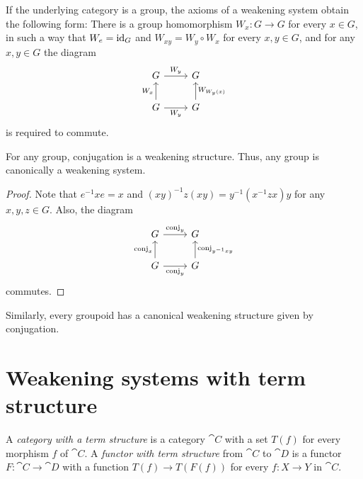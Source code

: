 \begin{rmk}
If the underlying category is a group, the axioms of a weakening system
obtain the following form: There is a group homomorphism $W_x:G\to G$ for
every $x\in G$, in such a way that $W_e={\mathrm{id}_{G}}$ and $W_{xy}=W_y\circ W_x$
for every $x,y\in G$, and for any $x,y\in G$ the diagram
\begin{equation*}
\begin{tikzcd}
G \arrow[r,"W_y"]
  &
G 
  \\
G \arrow[u,"W_x"]
  \arrow[r,swap,"W_y"]
  &
G \arrow[u,swap,"W_{W_y(x)}"]
\end{tikzcd}
\end{equation*}
is required to commute.
\end{rmk}

\begin{lem}
For any group, conjugation is a weakening structure. Thus, any group is
canonically a weakening system.
\end{lem}

\begin{proof}
Note that $e^{-1}xe=x$ and $(xy)^{-1}z(xy)=y^{-1}(x^{-1}zx)y$ for any $x,y,z\in G$.
Also, the diagram
\begin{equation*}
\begin{tikzcd}
G \arrow[r,"\mathrm{conj}_y"]
  &
G 
  \\
G \arrow[u,"\mathrm{conj}_x"]
  \arrow[r,swap,"\mathrm{conj}_y"]
  &
G \arrow[u,swap,"\mathrm{conj}_{y^{-1}xy}"]
\end{tikzcd}
\end{equation*}
commutes.
\end{proof}

\begin{rmk}
Similarly, every groupoid has a canonical weakening structure given by
conjugation.
\end{rmk}

\section{Weakening systems with term structure}
\begin{defn}
A \emph{category with a term structure} is a category $\cat{C}$ with a set $T(f)$ for every
morphism $f$ of $\cat{C}$. A \emph{functor with term structure} from $\cat{C}$ to $\cat{D}$
is a functor $F:\cat{C}\to\cat{D}$ with a function $T(f)\to T(F(f))$ for
every $f:X\to Y$ in $\cat{C}$.
\end{defn}

